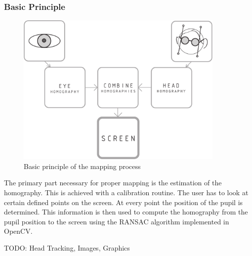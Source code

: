\subsubsection{Basic Principle}
\begin{figure}[H]
  \centering
  \includegraphics[width=0.9\textwidth]{../finalpres/01c.pdf}
  \caption{Basic principle of the mapping process}\label{fig:basic}
\end{figure}
The primary part necessary for proper mapping is the estimation of the homography. 
This is achieved with a calibration routine. The user has to look at certain defined points on the screen. 
At every point the position of the pupil is determined. 
This information is then used to compute the homography from the pupil position to the screen using the RANSAC algorithm implemented in OpenCV. 

TODO: Head Tracking, Images, Graphics

